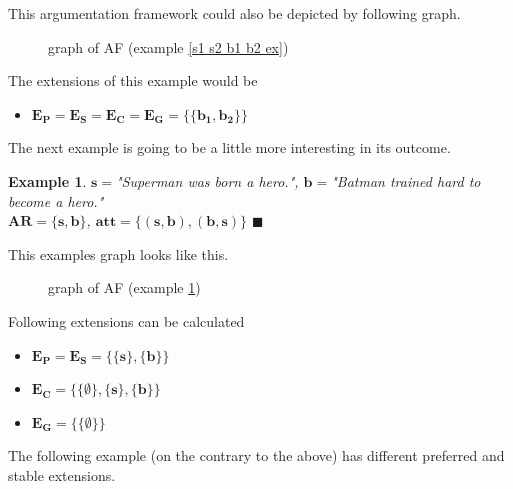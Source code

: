 \documentclass[12pt]{report}
\numberwithin{figure}{chapter}
\theoremstyle{break}
\newtheorem{exmpl}{Example}[chapter]
\newenvironment{myexmpl}{\begin{exmpl}}{$\blacksquare$ \end{exmpl}}
\begin{document}
This argumentation framework could also be depicted by following graph.

\begin{figure}[h!]
\begin{center}\end{center}
\caption{graph of AF (example \ref{s1 s2 b1 b2 ex})}
\end{figure}

The extensions of this example would be 
\begin{itemize}
	\item{$\bm{E_{P}=E_{S}=E_{C}=E_{G}=\{\{b_{1},b_{2}\}\}}$}
\end{itemize}

\bigskip
The next example is going to be a little more interesting in its outcome.
\begin{myexmpl}
$\bm{s=}$"Superman was born a hero.", $\bm{b=}$"Batman trained hard to become a hero."\\
$\bm{AR=\{s,b\}}$, $\bm{att=\{(s,b),(b,s)\}}$
\label{s b ex}
\end{myexmpl}

This examples graph looks like this.
\begin{figure}[h!]
\begin{center}\end{center}
\caption{graph of AF (example \ref{s b ex})}
\end{figure}

Following extensions can be calculated
\begin{itemize}
	\item{$\bm{E_{P}=E_{S}=\{\{s\},\{b\}\}}$}
	\item{$\bm{E_{C}=\{\{\emptyset\},\{s\},\{b\}\}}$}
	\item{$\bm{E_{G}=\{\{\emptyset\}\}}$}
\end{itemize}

The following example (on the contrary to the above) has different preferred and stable extensions.
\end{document}
